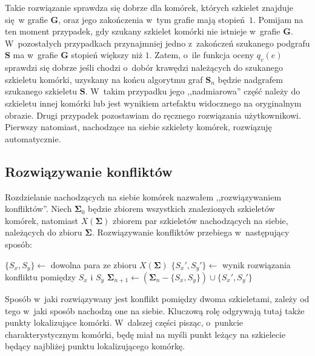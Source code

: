 \documentclass[declaration,shortabstract,mgr]{iithesis}
\begin{document}
Takie rozwiązanie sprawdza się dobrze dla komórek, których szkielet znajduje się w grafie $\mathbf{G}$, oraz jego zakończenia w~tym grafie mają stopień $1$. Pomijam na ten moment przypadek, gdy szukany szkielet komórki nie istnieje w~grafie $\mathbf{G}$. W~pozostałych przypadkach przynajmniej jedno z~zakończeń szukanego podgrafu $\mathbf{S}$ ma w~grafie $\mathbf{G}$ stopień większy niż $1$. Zatem, o~ile funkcja oceny $q_v(e)$ sprawdzi się dobrze jeśli chodzi o~dobór krawędzi należących do szukanego szkieletu komórki, uzyskany na końcu algorytmu graf $\mathbf{S}_n$ będzie nadgrafem szukanego szkieletu $\mathbf{S}$. W~takim przypadku jego ,,nadmiarowa'' część należy do szkieletu innej komórki lub jest wynikiem artefaktu widocznego na oryginalnym obrazie. Drugi przypadek pozostawiam do ręcznego rozwiązania użytkownikowi. Pierwszy natomiast, nachodzące na siebie szkielety komórek, rozwiązuję automatycznie.

\subsection{Rozwiązywanie konfliktów}
\label{sec:fix-conflicts}

Rozdzielanie nachodzących na siebie komórek nazwałem ,,rozwiązywaniem konfliktów''. Niech $\mathbf{\Sigma}_0$ będzie zbiorem wszystkich znalezionych szkieletów komórek, natomiast $X(\mathbf{\Sigma})$ zbiorem par szkieletów nachodzących na siebie, należących do zbioru $\mathbf{\Sigma}$. Rozwiązywanie konfliktów przebiega w~następujący sposób:

\par\bigskip
\begin{algorithmic}

  \STATE $\{S_x, S_y\} \gets$ dowolna para ze zbioru $X(\mathbf{\Sigma})$
  \STATE $\{S_x', S_y'\} \gets$ wynik rozwiązania konfliktu pomiędzy $S_x$ i $S_y$
  \STATE $\mathbf{\Sigma}_{n+1} \gets (\mathbf{\Sigma}_n - \{S_x, S_y\}) \cup \{S_x', S_y'\}$
\ENDWHILE

\end{algorithmic}
\par\bigskip

Sposób w~jaki rozwiązywany jest konflikt pomiędzy dwoma szkieletami, zależy od tego w~jaki sposób nachodzą one na siebie. Kluczową rolę odgrywają tutaj także punkty lokalizujące komórki. W~dalszej części pisząc, o~punkcie charakterystycznym komórki, będę miał na myśli punkt leżący na szkielecie będący najbliżej punktu lokalizującego komórkę.
\end{document}

